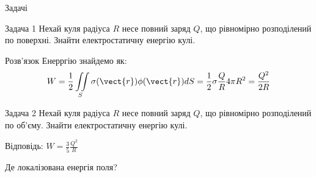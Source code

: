 \documentclass[onlytextwidth]{beamer}
\begin{document}
\begin{frame}{Задачі}{}\small
	\begin{exampleblock}{ Задача 1}\justifying
		Нехай куля радіуса $R$ несе повний заряд $Q$, що рівномірно розподілений по поверхні.
		Знайти електростатичну енергію кулі.
	\end{exampleblock}
	\begin{block}{Розв'язок}\justifying
		Енерргію знайдемо як:
		\begin{equation*}
			W =  \frac12 \iint\limits_S \sigma(\vect{r})\phi(\vect{r}) dS =
			\frac12\sigma\frac{Q}{R}4\pi
			R^2 = \frac{Q^2}{2R}
		\end{equation*}
	\end{block}

	\begin{exampleblock}{Задача 2}\justifying
		Нехай куля радіуса $R$ несе повний заряд $Q$, що рівномірно розподілений по об'єму.
		Знайти електростатичну енергію кулі.

		\bigskip

		Відповідь: $W = \frac35 \frac{Q^2}{R}$
	\end{exampleblock}

	\begin{alertblock}{}\centering
		Де локалізована енергія поля?
	\end{alertblock}
\end{frame}
\end{document}
